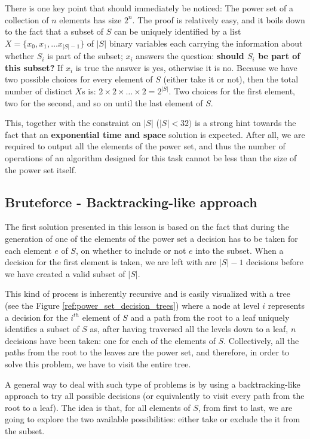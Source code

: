 There is one key point that should immediately be noticed: The power set of a collection of $n$ elements has size $2^n$. The proof  is relatively easy, and it boils down to the fact that a subset of $S$ can be uniquely identified by a list $X=\{x_0,x_1,\ldots x_{|S|-1}\}$ of $|S|$ binary variables each carrying the information about whether $S_i$ is part of the subset; $x_i$ answers the question: \textbf{should $S_i$ be part of this subset?} If $x_i$ is true the answer is yes, otherwise it is no. Because we have two possible choices for every element of $S$ (either take it or not), then the total number of distinct $X$s  is: $2 \times 2 \times \ldots \times 2 = 2^{|S|}$. Two choices for the first element, two for the second, and so on until the last element of $S$.
  
This, together with the constraint on $|S|$ ($|S| < 32)$ is a strong hint towards the fact that an \textbf{exponential time and space} solution is expected.
After all, we are required to output all the elements of the power set, and thus the number of operations of an algorithm designed for this task cannot be less than the size of the power set itself. 


\subsection{Bruteforce - Backtracking-like approach}


The first solution presented in this lesson is based on the fact that  during the generation of one of the elements of the power set a decision has to be taken for each element $e$ of $S$, on whether to include or not $e$ into the subset. 
When a decision for the first element is taken, we are left with are $|S|-1$ decisions
before we have created a valid subset of $|S|$.

This kind of process is inherently recursive and is easily visualized with a tree (see the Figure \ref{ref:power_set_decision_trees}) where a node at level $i$ represents a decision for the $i^{th}$ element of $S$ and a path from the root to a leaf uniquely identifies a subset of $S$ as, after having traversed all the levels down to a leaf, $n$ decisions have been taken: one for each of the elements of $S$. 
Collectively, all the paths from the root to the leaves are the power set, and therefore, in
order to solve this problem, we have to visit the entire tree.


A general way to deal with such type of problems is by using a backtracking-like approach to try all possible
decisions (or equivalently to visit every path from the root to a leaf).
The idea is that, for all elements of $S$, from first to last, we are going to
explore the two available possibilities: either take or exclude the
it from the subset.

